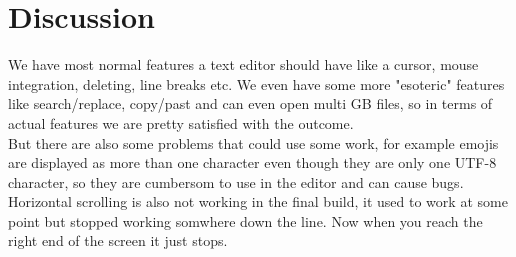 \section{Discussion}\label{sec:discussion}
We have most normal features a text editor should have like a cursor, mouse integration, deleting, line breaks etc.
We even have some more "esoteric" features like search/replace, copy/past and can even open multi GB files, so in terms of actual features we are pretty satisfied with the outcome.
\\But there are also some problems that could use some work, for example emojis are displayed as more than one character even though they are only one UTF-8 character, so they are cumbersom to use in the editor and can cause bugs.
\\Horizontal scrolling is also not working in the final build, it used to work at some point but stopped working somwhere down the line. Now when you reach the right end of the screen it just stops.